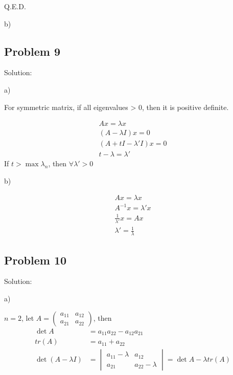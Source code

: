 \documentclass[letterpaper, 11pt]{article}
\newcommand{\1}{\mathds{1}}	%
\theoremstyle{definition}
\begin{document}
Q.E.D.

b)



\subsection*{Problem 9}

Solution:

a) 

For symmetric matrix, if all eigenvalues > 0, then it is positive definite.

\begin{align*}
    Ax=\lambda x \\
    (A-\lambda I) x = 0 \\
    (A+tI -\lambda'I) x = 0 \\
    t-\lambda=\lambda'
\end{align*}
If $t > \max{\lambda_n}$, then $\forall \lambda' > 0$

b)

\begin{align*}
    Ax=\lambda x \\
    A ^{-1}x = \lambda' x \\
    \frac{1}{\lambda'} x = A x \\
    \lambda' = \frac{1}{\lambda} 
\end{align*}

\subsection*{Problem 10}

Solution:

a)

$n=2$, let $A = \begin{pmatrix}
        a_{11} & a_{12} \\
        a_{21} & a_{22}
    \end{pmatrix}$, then \begin{align*}
    \det A             & = a_{11}a_{22} - a_{12}a_{21}            \\
    tr(A)              & = a_{11} + a_{22}                        \\
    \det (A-\lambda I) & = \begin{vmatrix}
                               a_{11} -\lambda & a_{12}          \\
                               a_{21}          & a_{22} -\lambda
                           \end{vmatrix} = \det A - \lambda tr(A)
\end{align*}
\end{document}
